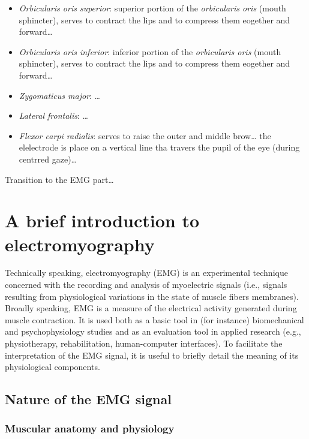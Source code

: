 \documentclass[a4paper,12pt,twoside,openright,oldfontcommands]{memoir}
\begin{document}
\begin{itemize}
\item
  \emph{Orbicularis oris superior}: superior portion of the
  \emph{orbicularis oris} (mouth sphincter), serves to contract the lips
  and to compress them eogether and forward\ldots{}
\item
  \emph{Orbicularis oris inferior}: inferior portion of the
  \emph{orbicularis oris} (mouth sphincter), serves to contract the lips
  and to compress them eogether and forward\ldots{}
\item
  \emph{Zygomaticus major}: \ldots{}
\item
  \emph{Lateral frontalis}: \ldots{}
\item
  \emph{Flexor carpi radialis}: serves to raise the outer and middle
  brow\ldots{} the elelectrode is place on a vertical line tha travers
  the pupil of the eye (during centrred gaze)\ldots{}
\end{itemize}

Transition to the EMG part\ldots{}

\section{A brief introduction to
electromyography}\label{a-brief-introduction-to-electromyography}

Technically speaking, electromyography (EMG) is an experimental
technique concerned with the recording and analysis of myoelectric
signals (i.e., signals resulting from physiological variations in the
state of muscle fibers membranes). Broadly speaking, EMG is a measure of
the electrical activity generated during muscle contraction. It is used
both as a basic tool in (for instance) biomechanical and
psychophysiology studies and as an evaluation tool in applied research
(e.g., physiotherapy, rehabilitation, human-computer interfaces). To
facilitate the interpretation of the EMG signal, it is useful to briefly
detail the meaning of its physiological components.

\subsection{Nature of the EMG signal}\label{nature-of-the-emg-signal}

\subsubsection{Muscular anatomy and
physiology}\label{muscular-anatomy-and-physiology}
\end{document}
